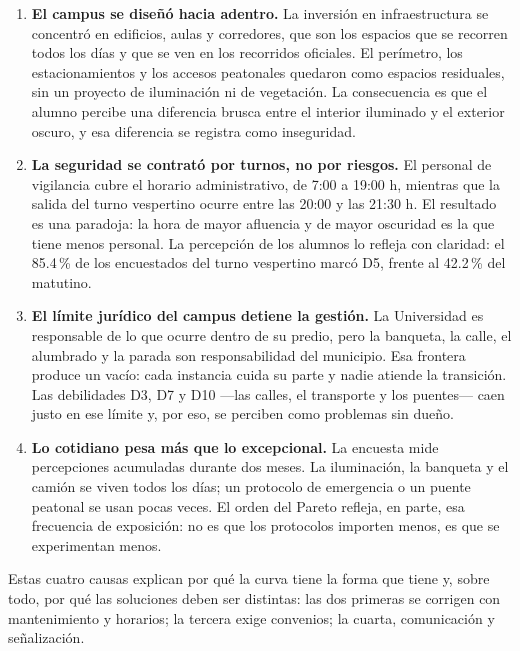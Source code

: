 \documentclass[11pt,a4paper]{article}
\begin{document}
\begin{enumerate}
  \item \textbf{El campus se diseñó hacia adentro.} La inversión en
        infraestructura se concentró en edificios, aulas y corredores, que son
        los espacios que se recorren todos los días y que se ven en los
        recorridos oficiales. El perímetro, los estacionamientos y los accesos
        peatonales quedaron como espacios residuales, sin un proyecto de
        iluminación ni de vegetación. La consecuencia es que el alumno percibe
        una diferencia brusca entre el interior iluminado y el exterior oscuro,
        y esa diferencia se registra como inseguridad.

  \item \textbf{La seguridad se contrató por turnos, no por riesgos.} El
        personal de vigilancia cubre el horario administrativo, de 7:00 a 19:00
        h, mientras que la salida del turno vespertino ocurre entre las 20:00 y
        las 21:30 h. El resultado es una paradoja: la hora de mayor afluencia y
        de mayor oscuridad es la que tiene menos personal. La percepción de los
        alumnos lo refleja con claridad: el 85.4\,\% de los encuestados del
        turno vespertino marcó D5, frente al 42.2\,\% del matutino.

  \item \textbf{El límite jurídico del campus detiene la gestión.} La
        Universidad es responsable de lo que ocurre dentro de su predio, pero
        la banqueta, la calle, el alumbrado y la parada son responsabilidad del
        municipio. Esa frontera produce un vacío: cada instancia cuida su parte
        y nadie atiende la transición. Las debilidades D3, D7 y D10 ---las
        calles, el transporte y los puentes--- caen justo en ese límite y, por
        eso, se perciben como problemas sin dueño.

  \item \textbf{Lo cotidiano pesa más que lo excepcional.} La encuesta mide
        percepciones acumuladas durante dos meses. La iluminación, la banqueta y
        el camión se viven todos los días; un protocolo de emergencia o un
        puente peatonal se usan pocas veces. El orden del Pareto refleja, en
        parte, esa frecuencia de exposición: no es que los protocolos importen
        menos, es que se experimentan menos.
\end{enumerate}

Estas cuatro causas explican por qué la curva tiene la forma que tiene y, sobre
todo, por qué las soluciones deben ser distintas: las dos primeras se corrigen
con mantenimiento y horarios; la tercera exige convenios; la cuarta, comunicación
y señalización.
\end{document}
